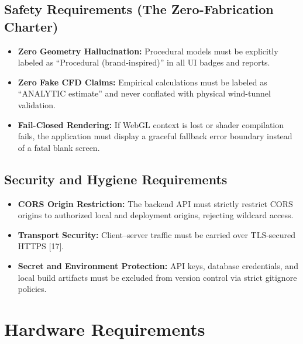\documentclass[12pt,a4paper]{report}
\begin{document}
\subsection{Safety Requirements (The Zero-Fabrication Charter)}
\begin{itemize}
    \item \textbf{Zero Geometry Hallucination:} Procedural models must be explicitly labeled as ``Procedural (brand-inspired)'' in all UI badges and reports.
    \item \textbf{Zero Fake CFD Claims:} Empirical calculations must be labeled as ``ANALYTIC estimate'' and never conflated with physical wind-tunnel validation.
    \item \textbf{Fail-Closed Rendering:} If WebGL context is lost or shader compilation fails, the application must display a graceful fallback error boundary instead of a fatal blank screen.
\end{itemize}

\subsection{Security and Hygiene Requirements}
\begin{itemize}
    \item \textbf{CORS Origin Restriction:} The backend API must strictly restrict CORS origins to authorized local and deployment origins, rejecting wildcard access.
    \item \textbf{Transport Security:} Client--server traffic must be carried over TLS-secured HTTPS [17].
    \item \textbf{Secret and Environment Protection:} API keys, database credentials, and local build artifacts must be excluded from version control via strict gitignore policies.
\end{itemize}

\section{Hardware Requirements}
\end{document}
